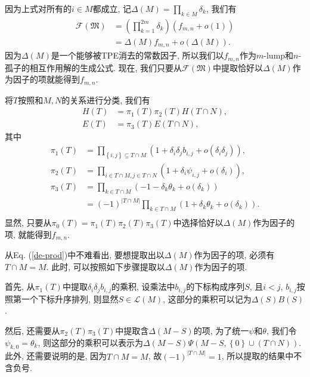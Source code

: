 \documentclass[12pt,a4paper,UTF8]{article}
\numberwithin{equation}{section}
\newcommand{\sbrace}[1]{\left(#1\right)}
\newcommand{\bbrace}[1]{\left\{#1\right\}}
\newcommand{\FM}{\mathfrak{M}}
\newcommand{\CF}{\mathcal{F}}
\newcommand{\refeqn}[1]{Eq. (\ref{#1})}
\newcommand{\MLNS}{$m$-lump和$n$-孤子的相互作用解}
\begin{document}
因为上式对所有的$i\in M$都成立, 记$\Delta(M)=\prod_{k\in M}{\delta_k}$, 我们有
\begin{equation}
\begin{aligned}
  \CF(\FM)&=\sbrace{\prod_{k=1}^{2m}{\delta_k}}\sbrace{f_{m,n}+o(1)}\\
  &=\Delta(M)f_{m,n}+o\sbrace{\Delta(M)}. 
\end{aligned}
\label{fmn-o}
\end{equation}
因为$\Delta(M)$是一个能够被TPE消去的常数因子, 所以我们以$f_{m,n}$作为\MLNS{}的生成公式. 现在, 我们只要从$\CF(\FM)$中提取恰好以$\Delta(M)$作为因子的项就能得到$f_{m,n}$.

将$T$按照和$M,N$的关系进行分类, 我们有
\begin{equation}
\begin{aligned}
  H(T)&=\pi_1(T)\pi_2(T)H(T\cap N), \\ 
  E(T)&=\pi_3(T)E(T\cap N),
\end{aligned}
\end{equation}
其中
\begin{equation}
\begin{aligned}
  \pi_1(T)&=\prod_{\bbrace{i,j}\subseteq T\cap M}\sbrace{1+\delta_i \delta_j b_{i,j}+o(\delta_i \delta_j)} ,\\
  \pi_2(T)&=\prod_{i\in T\cap M,j\in T\cap N}\sbrace{1+\delta_i \psi_{i,j}+o(\delta_i)} ,\\
  \pi_3(T)&=\prod_{k\in T\cap M}\sbrace{-1-\delta_k \theta_k+o(\delta_k)} \\
  &=(-1)^{|T\cap M|}\prod_{k\in T\cap M}\sbrace{1+\delta_k \theta_k+o(\delta_k)}.\\
\end{aligned}
\label{de-prod}
\end{equation}
显然, 只要从$\pi_0(T)=\pi_1(T)\pi_2(T)\pi_3(T)$中选择恰好以$\Delta(M)$作为因子的项, 就能得到$f_{m,n}$. 

从\refeqn{de-prod}中不难看出, 要想提取出以$\Delta(M)$作为因子的项, 必须有$T\cap M=M$. 此时, 可以按照如下步骤提取以$\Delta(M)$作为因子的项.

首先, 从$\pi_1(T)$中提取$\delta_i \delta_j b_{i,j}$的乘积, 设乘法中$b_{i,j}$的下标构成序列$S$, 且$i<j$, $b_{i,j}$按照第一个下标升序排列, 则显然$S\in \mathcal L(M)$, 这部分的乘积可以记为$\Delta(S)B(S)$. 

然后, 还需要从$\pi_2(T)\pi_3(T)$中提取含$\Delta(M-S)$的项, 为了统一$\psi$和$\theta$, 我们令$\psi_{k,0}=\theta_k$, 则这部分的乘积可以表示为$\Delta(M-S)\Psi(M-S,\bbrace{0}\cup (T\cap N))$. 此外, 还需要说明的是, 因为$T\cap M=M$, 故$(-1)^{|T\cap M|}=1$, 所以提取的结果中不含负号. 
\end{document}
